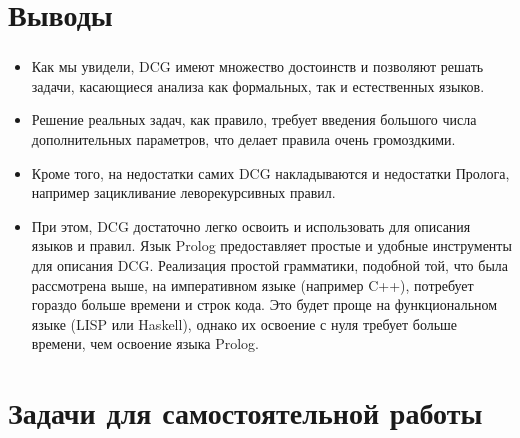 \section{Выводы}


\begin{frame}

	\frametitle{\insertsection}
	
	\begin{itemize}
		\item Как мы увидели, DCG имеют множество достоинств и позволяют решать задачи, касающиеся анализа как формальных, так и естественных языков.
		\item Решение реальных задач, как правило, требует введения большого числа дополнительных параметров, что делает правила очень громоздкими.
		\item Кроме того, на недостатки самих DCG накладываются и недостатки Пролога, например зацикливание леворекурсивных правил.
		\item При этом, DCG достаточно легко освоить и использовать для описания языков и правил. Язык Prolog предоставляет простые и удобные инструменты для описания DCG. Реализация простой грамматики, подобной той, что была рассмотрена выше, на императивном языке (например C++), потребует гораздо больше времени и строк кода. Это будет проще на функциональном языке (LISP или Haskell), однако их освоение с нуля требует больше времени, чем освоение языка Prolog.
	\end{itemize}

\end{frame}



\section{Задачи для самостоятельной работы}

	\begin{frame}
	
	\begin{center}
		\Huge \insertsection
	\end{center}

\end{frame}


